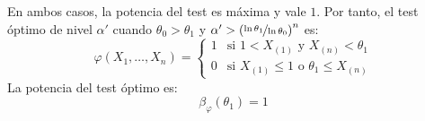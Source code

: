 \begin{ejercicio}
\begin{description}
\begin{description}
            En ambos casos, la potencia del test es máxima y vale $1$. Por tanto, el test óptimo de nivel $\alpha'$ cuando $\theta_0 > \theta_1$ y $\alpha' > \left(\nicefrac{\ln \theta_1}{\ln \theta_0}\right)^n$ es:
            \begin{equation*}
                \varphi(X_1, \ldots, X_n) = \left\{\begin{array}{ll}
                    1 & \text{si\ } 1 < X_{(1)} \text{\ y\ } X_{(n)} < \theta_1 \\
                    0 & \text{si\ } X_{(1)} \leq 1 \text{\ o\ } \theta_1 \leq X_{(n)}
                \end{array}\right.
            \end{equation*}
            La potencia del test óptimo es:
            \begin{equation*}
                \beta_\varphi(\theta_1) = 1
            \end{equation*}
        \end{description}
    \end{description}
\end{ejercicio}


